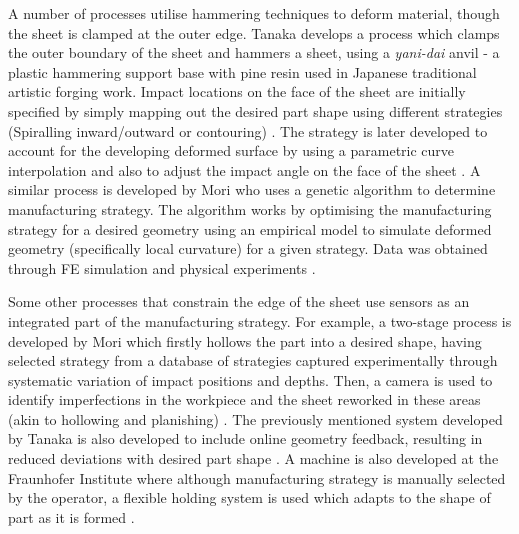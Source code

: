 A number of processes utilise hammering techniques to deform material, though the sheet is clamped at the outer edge. Tanaka develops a process which clamps the outer boundary of the sheet and hammers a sheet, using a \textit{yani-dai} anvil - a plastic hammering support base with pine resin used in Japanese traditional artistic forging work. Impact locations on the face of the sheet are initially specified by simply mapping out the desired part shape using different strategies (Spiralling inward/outward or contouring) \citep{Tanaka2005DevelopmentWorking}. The strategy is later developed to account for the developing deformed surface by using a parametric curve interpolation \citep{Asakawa2010DevelopmentProcess} and also to adjust the impact angle on the face of the sheet \citep{Takasugi2012DevelopmentShape}. A similar process is developed by Mori who uses a genetic algorithm to determine manufacturing strategy. The algorithm works by optimising the manufacturing strategy for a desired geometry using an empirical model to simulate deformed geometry (specifically local curvature) for a given strategy. Data was obtained through FE simulation and physical experiments \citep{Mori1996DeterminationAlgorithm}. 

Some other processes that constrain the edge of the sheet use sensors as an integrated part of the manufacturing strategy. For example, a two-stage process is developed by Mori which firstly hollows the part into a desired shape, having selected strategy from a database of strategies captured experimentally through systematic variation of impact positions and depths. Then, a camera is used to identify imperfections in the workpiece and the sheet reworked in these areas (akin to hollowing and planishing) \citep{Mori1998IncrementalDatabase}. The previously mentioned system developed by Tanaka is also developed to include online geometry feedback, resulting  in reduced deviations with desired part shape \citep{Tanaka2014DevelopmentHammering}. A machine is also developed at the Fraunhofer Institute where although manufacturing strategy is manually selected by the operator, a flexible holding system is used which adapts to the shape of part as it is formed \citep{Sharon2014FraunhoferReport}.

